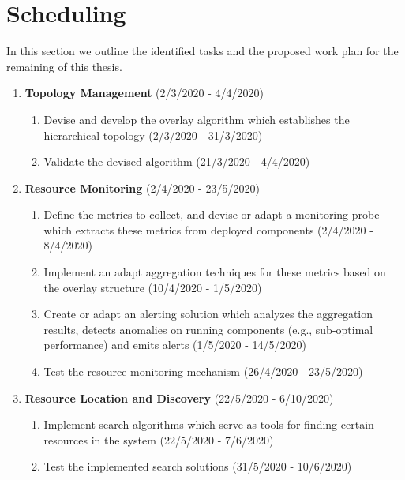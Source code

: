 \section{Scheduling}

In this section we outline the identified tasks and the proposed work plan for the remaining of this thesis. 

\begin{enumerate}
    \item \textbf{Topology Management} (2/3/2020 - 4/4/2020)
    
    \begin{enumerate}
        \item Devise and develop the overlay algorithm which establishes the hierarchical topology (2/3/2020 - 31/3/2020)
        \item Validate the devised algorithm (21/3/2020 - 4/4/2020)
    \end{enumerate}
    
    \item \textbf{Resource Monitoring} (2/4/2020 - 23/5/2020)
    
    \begin{enumerate}
        \item Define the metrics to collect, and devise or adapt a monitoring probe which extracts these metrics from deployed components (2/4/2020 - 8/4/2020)
        \item Implement an adapt aggregation techniques for these metrics based on the overlay structure (10/4/2020 - 1/5/2020)
        \item Create or adapt an alerting solution which analyzes the aggregation results, detects anomalies on running components (e.g., sub-optimal performance) and emits alerts (1/5/2020 - 14/5/2020)
        \item Test the resource monitoring mechanism (26/4/2020 - 23/5/2020)
    \end{enumerate}
    
    \item \textbf{Resource Location and Discovery} (22/5/2020 - 6/10/2020)
    
    \begin{enumerate}
        \item Implement search algorithms which serve as tools for finding certain resources in the system (22/5/2020 - 7/6/2020)
        \item Test the implemented search solutions (31/5/2020 - 10/6/2020)
    \end{enumerate}
    

\end{enumerate}
